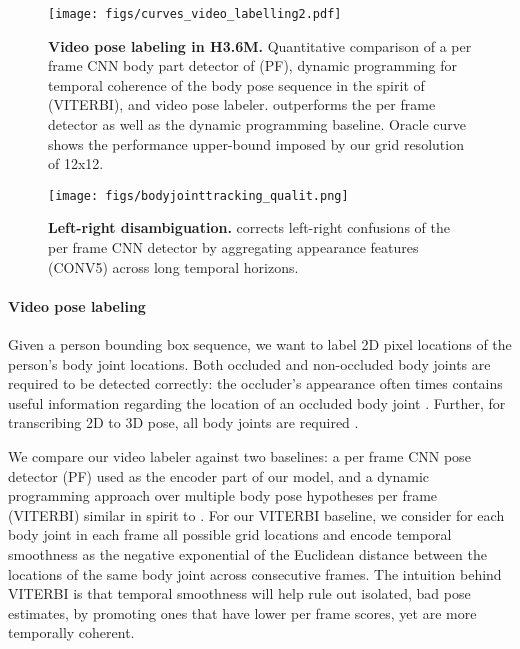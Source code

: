\documentclass[10pt,twocolumn,letterpaper]{article}
\begin{document}
\begin{figure*}[ht]
\begin{center}
\texttt{[image: figs/curves\_video\_labelling2.pdf]}
\end{center}
\caption{\textbf{Video pose labeling in H3.6M.}  Quantitative comparison of  a per frame CNN body part detector  of \cite{vpsKpsTulsianiM14} (PF), dynamic programming for temporal coherence of the body pose sequence in the spirit of \cite{DBLP:conf/iccv/ParkR11,Batra:2012:DMS:2403138.2403140} (VITERBI), and   video pose labeler.    outperforms the per frame detector as well as the dynamic programming baseline.   Oracle curve shows the performance upper-bound  imposed by our grid resolution of 12x12.}
\label{fig:bjtquant}
\end{figure*}




 \begin{figure*}[ht]
 \begin{center}
\texttt{[image: figs/bodyjointtracking\_qualit.png]}
 \end{center}
\caption{\textbf{Left-right disambiguation.}  corrects  left-right confusions of the per frame CNN detector   by  aggregating   appearance  features (CONV5) across long temporal horizons.}
 \label{fig:leftright}
 \end{figure*}



\paragraph{Video pose labeling}
  Given a person bounding  box sequence, we want to label 2D pixel locations of the person's body joint locations. 
Both occluded and non-occluded body joints are required to be detected correctly: the occluder's appearance often times contains useful information regarding the location of an occluded body joint \cite{DBLP:conf/eccv/DesaiR12}. 
  Further, for transcribing 2D to 3D pose, all body joints are required  \cite{Taylor:2000:RAO:364058.364079}. 
  


We compare our  video labeler against two baselines: a per frame CNN pose detector (PF) used as the encoder part of our  model, and a dynamic programming approach over multiple body pose hypotheses per frame (VITERBI) similar in spirit to \cite{DBLP:conf/iccv/ParkR11,Batra:2012:DMS:2403138.2403140}. For our VITERBI baseline, we consider for each body joint in each frame all possible grid locations and encode temporal smoothness as the negative exponential of the Euclidean distance between the locations of the same body joint  across consecutive frames.  The intuition behind VITERBI is that temporal smoothness will help rule out isolated, bad pose estimates, by promoting ones that have lower per frame scores, yet are more temporally coherent.   
\end{document}
